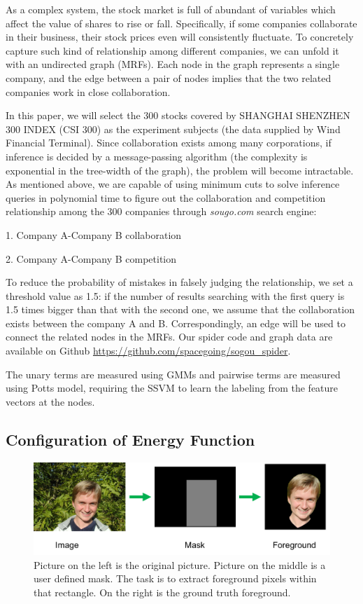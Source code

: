 As a complex system, the stock market is full of abundant of
variables which affect the value of shares to rise or fall.
Specifically, if some companies collaborate in their business,
their stock prices even will consistently fluctuate. To
concretely capture such kind of relationship among different
companies, we can unfold it with an undirected graph (MRFs). Each
node in the graph represents a single company, and the edge
between a pair of nodes implies that the two related companies
work in close collaboration.

In this paper, we will select the 300 stocks covered by SHANGHAI
SHENZHEN 300 INDEX (CSI 300) as the experiment subjects (the data
supplied by Wind Financial Terminal). Since collaboration exists
among many corporations, if inference is decided by a
message-passing algorithm (the complexity is exponential in the
tree-width of the graph), the problem will become intractable. As
mentioned above, we are capable of using minimum cuts to solve
inference queries in polynomial time to figure out the
collaboration and competition relationship among the 300
companies through \emph{sougo.com} search engine:

1. Company A-Company B collaboration

2. Company A-Company B competition

To reduce the probability of mistakes in falsely judging the
relationship, we set a threshold value as 1.5: if the number of
results searching with the first query is 1.5 times bigger than
that with the second one, we assume that the collaboration exists
between the company A and B. Correspondingly, an edge will be
used to connect the related nodes in the MRFs. Our spider code
and graph data are available on Github
\url{https://github.com/spacegoing/sogou_spider}.

The unary terms are measured using GMMs and pairwise terms are
measured using Potts model, requiring the SSVM to learn the
labeling from the feature vectors at the nodes.

\subsection{Configuration of Energy Function}
\label{sec:grabcut}

\begin{figure}[b]
  \centering
  \includegraphics[width=1\linewidth]{RelatedWorks/figures/grabcut_task.png}
  \caption{\label{fig:grabcut_example} Picture on the left is
    the original picture. Picture
    on the middle is a user defined mask. The task is to extract
    foreground pixels within that rectangle. On the right is the
    ground truth foreground.}
\end{figure}

